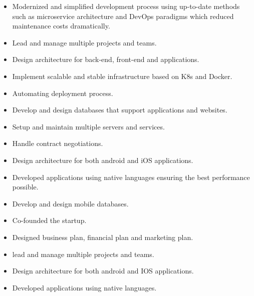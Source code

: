 \documentclass[10pt,a4paper,ragged2e,withhyper]{altacv}
\begin{document}
\begin{paracol}{2}

\begin{itemize}
\item Modernized and simplified development process using up-to-date methods such as microservice architecture and DevOps paradigms which reduced maintenance costs dramatically.
\item Lead and manage multiple projects and teams.
\item Design architecture for back-end, front-end and applications.
\item Implement scalable and stable infrastructure based on K8s and Docker.
\item Automating deployment process.
\item Develop and design databases that support applications and websites.
\item Setup and maintain multiple servers and services.
\item Handle contract negotiations.
\end{itemize}

\divider

\begin{itemize}
\item Design architecture for both android and iOS applications.
\item Developed applications using native languages ensuring the best performance possible.
\item Develop and design mobile databases.
\end{itemize}

\divider

\begin{itemize}
\item Co-founded the startup.
\item Designed business plan, financial plan and marketing plan.
\item lead and manage multiple projects and teams.
\item Design architecture for both android and IOS applications.
\item Developed applications using native languages.
\end{itemize}


\end{paracol}
\end{document}
